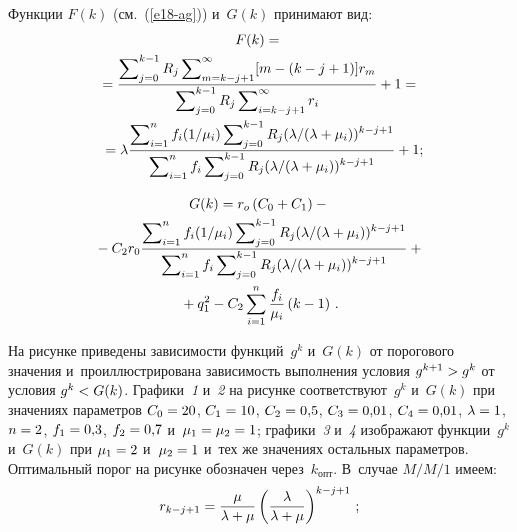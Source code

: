 \begin{multicols}{2}
  
  Функции $F(k)$ (см.~(\ref{e18-ag})) и~$G(k)$ принимают вид:
  \begin{multline*}
  F(k) = {}\\
  {}=
  \displaystyle\frac{\displaystyle \sum\nolimits_{j=0}^{k-1} R_j \sum\nolimits^\infty_{m=k-j+1} [m-(k-
j+1)]r_m\mathstrut}{\displaystyle \sum\nolimits_{j=0}^{k-1} R_j  \sum\nolimits^\infty_{i=k-j+1} 
r_i\mathstrut}+1={}\\
  {}= \lambda \displaystyle\frac{\displaystyle \sum\nolimits^n_{i=1} f_i (1/\mu_i) \sum\nolimits_{j=0}^{k-1} 
R_j (\lambda/(\lambda+\mu_i))^{k-j+1}\mathstrut}{\displaystyle \sum\nolimits^n_{i=1} f_i 
\sum\nolimits_{j=0}^{k-1} R_j (\lambda/(\lambda+\mu_i))^{k-j+1}\mathstrut}+1;\hspace*{-4.41524pt}
  \end{multline*}
  
  \vspace*{-12pt}
  
  \noindent
  \begin{multline*}
  G(k) = r_o\left( C_0+C_1\right) -{}\\
  {}- C_2 r_0 \displaystyle\frac{\displaystyle \sum\nolimits_{i=1}^n f_i (1/\mu_i) \sum\nolimits_{j=0}^{k-1} 
R_j (\lambda/(\lambda+\mu_i))^{k-j+1} \mathstrut}{\displaystyle \sum\nolimits_{i=1}^n f_i  
\sum\nolimits_{j=0}^{k-1} R_j (\lambda/(\lambda+\mu_i))^{k-j+1}\mathstrut} +{}\\
{}+q_1^2 -C_2 
\sum\limits_{i=1}^n \displaystyle\frac{\displaystyle f_i\mathstrut}{\displaystyle \mu_i\mathstrut}\left(k-1\right)\,.
  \end{multline*}
  


  На рисунке приведены зависимости функций~$g^k$ и~$G(k)$ от порогового 
значения и~проиллюстрирована зависимость выполнения условия 
$g^{k+1}\hm> g^k$ от условия $g^k\hm< G(k)$. Графики~\textit{1} и~\textit{2} 
на рисунке соответствуют~$g^k$ и~$G(k)$ при значениях параметров 
$C_0\hm= 20$, $C_1\hm= 10$, $C_2\hm= 0{,}5$, $C_3\hm= 0{,}01$, $C_4\hm= 
0{,}01$, $\lambda\hm= 1$, $n\hm=2$, $f_1\hm= 0{,}3$, $f_2\hm= 0{,}7$  
и~$\mu_1\hm=\mu_2\hm=1$; графики~\textit{3} и~\textit{4} изображают 
функции~$g^k$ и~$G(k)$ при $\mu_1\hm=2$ и~$\mu_2\hm=1$ и~тех же значениях 
остальных параметров. Оптимальный порог на рисунке обозначен 
через~$k_{\mathrm{опт}}$. В~случае $M/M/1$ имеем:
  $$
  r_{k-j+1} = \displaystyle\frac{\displaystyle \mu\mathstrut}{\displaystyle \lambda+\mu\mathstrut} \left( 
\displaystyle\frac{\displaystyle \lambda\mathstrut}{\displaystyle \lambda+\mu\mathstrut}\right)^{k-j+1}\,;
  $$
 

  
\noindent
 \begin{center}
 \vspace*{1pt}
 \mbox{%
 \epsfxsize=77.829mm
 }

 \end{center}
 

\end{multicols}
